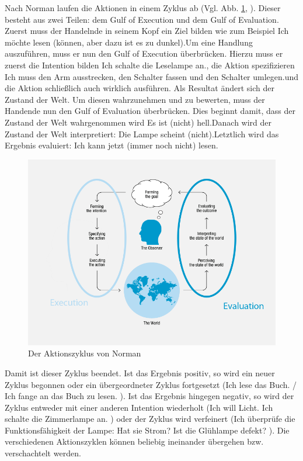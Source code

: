 \documentclass[parskip,headsepline, headtopline, %
footsepline, oneside, 12pt, headings=small]{scrreprt}
\begin{document}
Nach Norman laufen die Aktionen in einem Zyklus ab (Vgl. Abb. \ref{fig:action}, \cite[S. 46ff]{don}). Dieser besteht aus zwei Teilen: dem Gulf of Execution und dem Gulf of Evaluation. Zuerst muss der Handelnde in seinem Kopf ein Ziel bilden wie zum Beispiel \glqq Ich möchte lesen (können, aber dazu ist es zu dunkel).\grqq Um eine Handlung auszuführen, muss er nun den Gulf of Execution überbrücken. Hierzu muss er zuerst die Intention bilden \glqq Ich schalte die Leselampe an.\grqq, die Aktion spezifizieren \glqq Ich muss den Arm ausstrecken, den Schalter fassen und den Schalter umlegen.\grqq und die Aktion schließlich auch wirklich ausführen. Als Resultat ändert sich der Zustand der Welt. Um diesen wahrzunehmen und zu bewerten, muss der Handende nun den Gulf of Evaluation überbrücken. Dies beginnt damit, dass der Zustand der Welt wahrgenommen wird \glqq Es ist (nicht) hell.\grqq Danach wird der Zustand der Welt interpretiert: \glqq Die Lampe scheint (nicht).\grqq Letztlich wird das Ergebnis evaluiert: \glqq Ich kann jetzt (immer noch nicht) lesen.\grqq

\begin{figure}
\includegraphics[width=\textwidth]{images/ActionCycle.png}
\caption{Der Aktionszyklus von Norman}
\label{fig:action}
\end{figure}

Damit ist dieser Zyklus beendet. Ist das Ergebnis positiv, so wird ein neuer Zyklus begonnen oder ein übergeordneter Zyklus fortgesetzt (\glqq Ich lese das Buch. / Ich fange an das Buch zu lesen. \grqq). Ist das Ergebnis hingegen negativ, so wird der Zyklus entweder mit einer anderen Intention wiederholt (\glqq Ich will Licht. \textrightarrow Ich schalte die Zimmerlampe an. \grqq) oder der Zyklus wird verfeinert (\glqq Ich überprüfe die Funktionsfähigkeit der Lampe: Hat sie Strom? Ist die Glühlampe defekt?  \grqq). Die verschiedenen Aktionszyklen können beliebig ineinander übergehen bzw. verschachtelt werden. 
\end{document}
